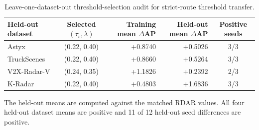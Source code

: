 \documentclass[preprint,12pt,times]{elsarticle}
\newcommand{\reviewcaption}[1]{\caption{\textcolor{floatreviewblue}{#1}}}
\newcommand{\reviewcaption}[1]{\caption{#1}}
\begin{document}
\begin{table}[!t]
\centering
\reviewcaption{Leave-one-dataset-out threshold-selection audit for strict-route
threshold transfer.}
\label{tab:lodo-audit}
\begingroup
\color{black}
\scriptsize
\setlength{\tabcolsep}{3pt}
\renewcommand{\arraystretch}{1.12}
\begin{tabularx}{\columnwidth}{@{}Xc rr c@{}}
\toprule
Held-out dataset & Selected $(\tau_v,\lambda)$ & Training mean $\Delta$AP & Held-out mean $\Delta$AP & Positive seeds \\
\midrule
Astyx & (0.22, 0.40) & +0.8740 & +0.5026 & 3/3 \\
TruckScenes & (0.22, 0.40) & +0.8660 & +0.5264 & 3/3 \\
V2X-Radar-V & (0.24, 0.35) & +1.1826 & +0.2392 & 2/3 \\
K-Radar & (0.22, 0.40) & +0.4803 & +1.6836 & 3/3 \\
\bottomrule
\end{tabularx}
\endgroup
\vspace{2pt}
\parbox{\columnwidth}{\scriptsize
The held-out means are computed against the matched RDAR values. All four
held-out dataset means are positive and 11 of 12 held-out seed differences are
positive.}
\end{table}
\end{document}
